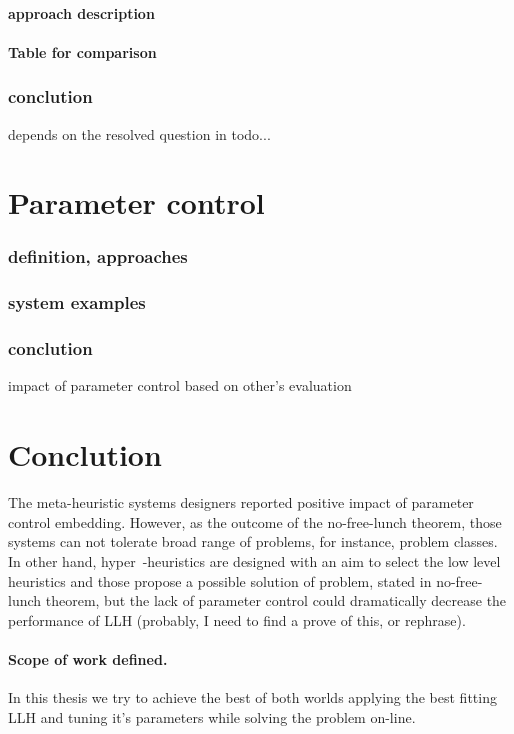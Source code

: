 \paragraph{approach description}


\paragraph{Table for comparison}

\subsubsection{conclution}
depends on the resolved question in todo...


\section{Parameter control}
\subsubsection{definition, approaches}
\subsubsection{system examples}
\subsubsection{conclution} impact of parameter control based on other's evaluation


\section{Conclution}

The meta-heuristic systems designers reported positive impact of parameter control embedding. 
However, as the outcome of the no-free-lunch theorem, those systems can not tolerate broad range of problems, for instance, problem classes.
In other hand, hyper~-heuristics are designed with an aim to select the low level heuristics and those propose a possible solution of problem, stated in no-free-lunch theorem, but the lack of parameter control could dramatically decrease the performance of LLH (probably, I need to find a prove of this, or rephrase).

\paragraph{Scope of work defined.} In this thesis we try to achieve the best of both worlds applying the best fitting LLH and tuning it's parameters while solving the problem on-line.
